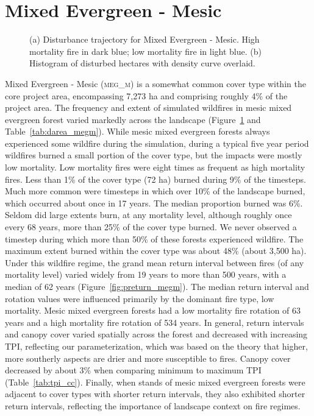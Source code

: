 \section{Mixed Evergreen - Mesic} 

\begin{figure}[!htbp]
  \centering
  \caption{(a) \small Disturbance trajectory for Mixed Evergreen - Mesic. High mortality fire in dark blue; low mortality fire in light blue. (b) Histogram of disturbed hectares with density curve overlaid.} 
  \label{fig:darea_megm}
\end{figure}

Mixed Evergreen - Mesic (\textsc{meg\_m}) is a somewhat common cover type within the core project area, encompassing 7,273 ha and comprising roughly 4\% of the project area. The frequency and extent of simulated wildfires in mesic mixed evergreen forest varied markedly across the landscape (Figure~\ref{fig:darea_megm} and Table~\ref{tab:darea_megm}). %
%
While mesic mixed evergreen forests always experienced some wildfire during the simulation, during a typical five year period wildfires burned a small portion of the cover type, but the impacts were mostly low mortality. Low mortality fires were eight times as frequent as high mortality fires. Less than 1\% of the cover type (72 ha) burned during 9\% of the timesteps. Much more common were timesteps in which over 10\% of the landscape burned, which occurred about once in 17 years. The median proportion burned was 6\%. Seldom did large extents burn, at any mortality level, although roughly once every 68 years, more than 25\% of the cover type burned. We never observed a timestep during which more than 50\% of these forests experienced wildfire. The maximum extent burned within the cover type was about 48\% (about 3,500 ha). %
%
Under this wildfire regime, the grand mean return interval between fires (of any mortality level) varied widely from 19 years to more than 500 years, with a median of 62 years (Figure~\ref{fig:preturn_megm}). The median return interval and rotation values were influenced primarily by the dominant fire type, low mortality. Mesic mixed evergreen forests had a low mortality fire rotation of 63 years and a high mortality fire rotation of 534 years. %
%
In general, return intervals and canopy cover varied spatially across the forest and decreased with increasing TPI, reflecting our parameterization, which was based on the theory that higher, more southerly aspects are drier and more susceptible to fires. Canopy cover decreased by about 3\% when comparing minimum to maximum TPI (Table~\ref{tab:tpi_cc}). %
%
Finally, when stands of mesic mixed evergreen forests were adjacent to cover types with shorter return intervals, they also exhibited shorter return intervals, reflecting the importance of landscape context on fire regimes.

